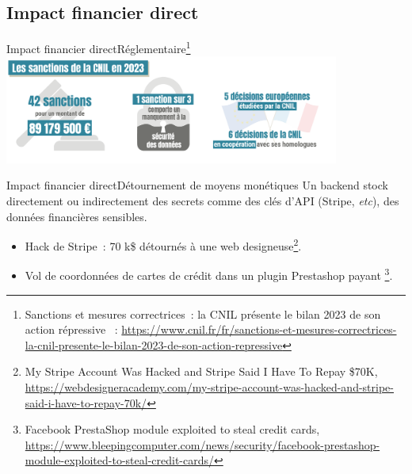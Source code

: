 \documentclass{beamer}
\begin{document}
    \subsection{Impact financier direct}\label{subsec:impact-financier-direct}
    \begin{frame}{Impact financier direct}{Réglementaire\footnote{Sanctions et mesures correctrices~: la CNIL présente le bilan 2023 de son action répressive ~: \url{https://www.cnil.fr/fr/sanctions-et-mesures-correctrices-la-cnil-presente-le-bilan-2023-de-son-action-repressive}}}
        \centering
        \includegraphics[width=11cm]{image/sanctions-cnil-2023}
    \end{frame}

    \begin{frame}{Impact financier direct}{Détournement de moyens monétiques}
        Un backend stock directement ou indirectement des secrets comme des clés d'API (Stripe, \textit{etc}), des données financières sensibles.
        \begin{itemize}
            \item Hack de Stripe~: 70 k\$ détournés à une web designeuse\footnote{My Stripe Account Was Hacked and Stripe Said I Have To Repay \$70K, \url{https://webdesigneracademy.com/my-stripe-account-was-hacked-and-stripe-said-i-have-to-repay-70k/}}.
            \item Vol de coordonnées de cartes de crédit dans un plugin Prestashop payant \footnote{Facebook PrestaShop module exploited to steal credit cards, \url{https://www.bleepingcomputer.com/news/security/facebook-prestashop-module-exploited-to-steal-credit-cards/}}.
        \end{itemize}
    \end{frame}
\end{document}
